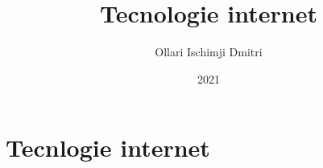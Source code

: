 \documentclass{article}
\begin{document}
    \author{Ollari Ischimji Dmitri}
    \title{Tecnologie internet}
    \date{2021}

    \maketitle
    \tableofcontents
    \listoffigures
    \listoftables

    \section{Tecnlogie internet}
    
    
    
    
    
    
    
    
    
    
    
    
    


    
    
    
    
    
    
    
    

    
\end{document}
